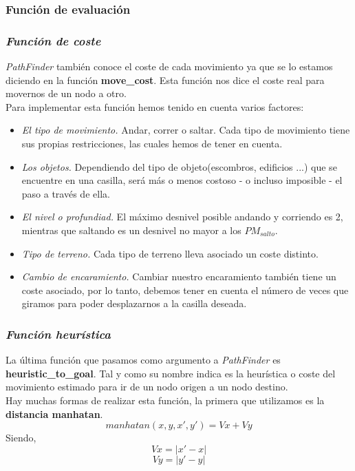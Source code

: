 \documentclass[a4paper,12pt,oneside]{book}
\begin{document}
\subsubsection{Función de evaluación}

\subsubsection{{\it \bf Función de coste}}

{\it PathFinder} también conoce el coste de cada movimiento ya que se
lo estamos diciendo en la función {\bf move\_cost}. Esta función nos
dice el coste real para movernos de un nodo a otro. \\

Para implementar esta función hemos tenido en cuenta varios factores:
\begin{itemize}
\item {\it El tipo de movimiento.} Andar, correr o saltar. Cada tipo de
  movimiento tiene sus propias restricciones, las cuales hemos de tener en
  cuenta.
\item {\it Los objetos.} Dependiendo del tipo de objeto(escombros, edificios ...) que se encuentre en una
  casilla, será más o menos costoso - o incluso imposible - el paso a través de
  ella.
\item {\it El nivel o profundiad.} El máximo desnivel posible andando y
  corriendo es 2, mientras que saltando es un desnivel no mayor a los
  $PM_{salto}$.
\item {\it Tipo de terreno.} Cada tipo de terreno lleva asociado un coste distinto.
\item {\it Cambio de encaramiento.} Cambiar nuestro encaramiento también tiene
  un coste asociado, por lo tanto, debemos tener en cuenta el número de veces
  que giramos para poder desplazarnos a la casilla deseada.
\end{itemize}


\subsubsection{{\it \bf Función heurística}}

La última función que pasamos como argumento a {\it PathFinder} es
{\bf heuristic\_to\_goal}. Tal y como su nombre indica es la
heurística o coste del movimiento estimado para ir de un nodo origen a
un nodo destino.\\

Hay muchas formas de realizar esta función, la primera que utilizamos
es la {\bf distancia manhatan}.
$$ manhatan(x,y, x',y') = Vx + Vy $$
Siendo,
$$Vx = |x'-x| $$
$$Vy = |y'-y| $$
\end{document}

